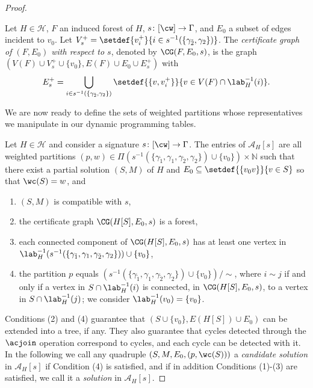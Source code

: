 \begin{proof}
    \begin{definition}\label{defn:certif}
        Let $H \in \mathcal{H}$, $F$ an induced forest of $H$,
        $s \colon [\cw] \to \Gamma$,
        and $E_0$ a subset of edges incident to $v_0$.
        Let $V^+_s = \setdef{v^+_i}{i \in s^{-1}(\{\gamma_{\tilde{2}},\gamma_2\})}$.
        The \emph{certificate graph of $(F,E_0)$ with respect to $s$},
        denoted by $\CG(F,E_0,s)$,
        is the graph $(V(F) \cup V_s^+ \cup \{v_0\}, E(F) \cup E_0 \cup E_s^+)$ with
        \[
            E_s^+ = \bigcup_{i \in s^{-1}(\{\gamma_{\tilde{2}},\gamma_2\})} \setdef{\{v,v^+_i\}}{v \in V(F) \cap \lab^{-1}_H(i)}.
        \]
    \end{definition}

    We are now ready to define the sets of weighted partitions whose representatives we manipulate in our dynamic programming tables.

    \begin{definition}\label{defn:tabfvs}
        Let $H \in \mathcal{H}$ and consider a signature $s \colon [\cw] \to \Gamma$.
        The entries of $\mathcal{A}_H[s]$ are all weighted partitions
        $(p,w) \in \Pi(s^{-1}(\{\gamma_{\tilde{1}},\gamma_1,\gamma_{\tilde{2}},\gamma_2\}) \cup \{v_0\}) \times \mathbb{N}$
        such that there exist a partial solution $(S,M)$ of $H$ and $E_0 \subseteq \setdef{\{v_0 v\}}{v \in S}$
        so that $\wc (S) = w$, and
        \begin{enumerate}
            \item $(S, M)$ is compatible with $s$,

            \item the certificate graph $\CG(H[S],E_0,s)$ is a forest,

            \item each connected component of $\CG(H[S],E_0,s)$ has at least one vertex in
            $\lab^{-1}_H(s^{-1}(\{\gamma_{\tilde{1}},\gamma_1,\gamma_{\tilde{2}},\gamma_2\})) \cup \{v_0\}$,

            \item the partition $p$ equals $(s^{-1}(\{\gamma_{\tilde{1}},\gamma_1,\gamma_{\tilde{2}},\gamma_2\}) \cup \{v_0\})/\sim$,
            where $i \sim j$ if and only if a vertex in $S \cap \lab^{-1}_H(i)$ is connected, in $\CG(H[S],E_0,s)$,
            to a vertex in $S \cap \lab^{-1}_H(j)$; we consider $\lab^{-1}_H(v_0)=\{v_0\}$.
        \end{enumerate}
    \end{definition}
    Conditions (2) and (4) guarantee that $(S \cup \{v_0\},E(H[S]) \cup E_0)$ can be extended into a tree, if any.
    They also guarantee that cycles detected through the $\acjoin$ operation correspond to cycles,
    and each cycle can be detected with it.
    In the following we call any quadruple $(S,M,E_0,(p,\wc(S)))$ a \emph{candidate solution} in $\mathcal{A}_H[s]$ if Condition (4) is satisfied,
    and if in addition Conditions (1)-(3) are satisfied, we call it a \emph{solution} in $\mathcal{A}_H[s]$.


\end{proof}
